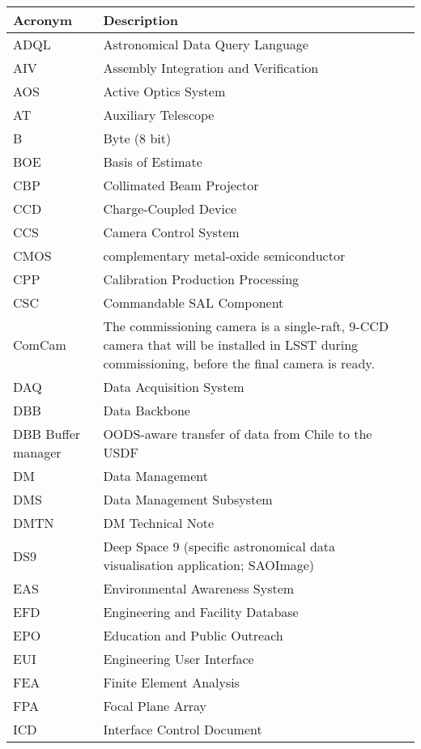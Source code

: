 \addtocounter{table}{-1}
\begin{longtable}{p{}p{}}\hline
\textbf{Acronym} & \textbf{Description}  \\\hline

ADQL & Astronomical Data Query Language \\\hline
AIV & Assembly Integration and Verification \\\hline
AOS & Active Optics System \\\hline
AT & Auxiliary Telescope \\\hline
B & Byte (8 bit) \\\hline
BOE & Basis of Estimate \\\hline
CBP & Collimated Beam Projector \\\hline
CCD & Charge-Coupled Device \\\hline
CCS & Camera Control System \\\hline
CMOS & complementary metal-oxide semiconductor \\\hline
CPP & Calibration Production Processing \\\hline
CSC & Commandable SAL Component \\\hline
ComCam & The commissioning camera is a single-raft, 9-CCD camera that will be installed in LSST during commissioning, before the final camera is ready. \\\hline
DAQ & Data Acquisition System \\\hline
DBB & Data Backbone \\\hline
DBB Buffer manager & OODS-aware transfer of data from Chile to the USDF \\\hline
DM & Data Management \\\hline
DMS & Data Management Subsystem \\\hline
DMTN & DM Technical Note \\\hline
DS9 & Deep Space 9 (specific astronomical data visualisation application; SAOImage) \\\hline
EAS & Environmental Awareness System \\\hline
EFD & Engineering and Facility Database \\\hline
EPO & Education and Public Outreach \\\hline
EUI & Engineering User Interface \\\hline
FEA & Finite Element Analysis \\\hline
FPA & Focal Plane Array \\\hline
ICD & Interface Control Document \\\hline

\end{longtable}
